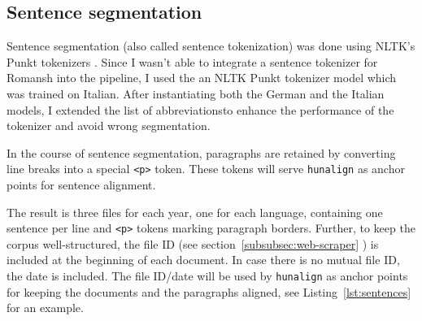 \subsection{Sentence segmentation}
Sentence segmentation (also called sentence tokenization) was done using NLTK's Punkt tokenizers \autocite{bird-2009-nltk}. 
Since I wasn't able to integrate a sentence tokenizer for Romansh into the pipeline, I used the an NLTK Punkt tokenizer model which was trained on Italian. 
After instantiating both the German and the Italian models, I extended the list of abbreviations\footnotemark to enhance the performance of the tokenizer and avoid wrong segmentation. 


In the course of sentence segmentation, paragraphs are retained by converting line breaks into a special \texttt{<p>} token. 
These tokens will serve \texttt{hunalign} as anchor points for sentence alignment.

The result is three files for each year, one for each language, containing one sentence per line and \texttt{<p>} tokens marking paragraph borders. 
Further, to keep the corpus well-structured, the file ID (see section~\ref{subsubsec:web-scraper} ) is included at the beginning of each document. 
In case there is no mutual file ID, the date is included. 
The file ID/date will be used by \texttt{hunalign} as anchor points for keeping the documents and the paragraphs aligned, see Listing~\ref{lst:sentences} for an example.

\vspace{0.5cm}

